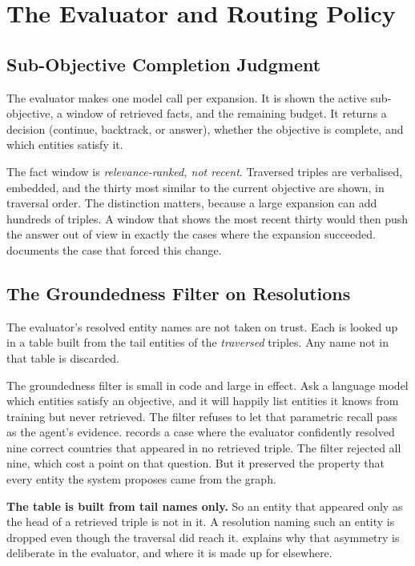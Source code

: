 \section{The Evaluator and Routing Policy}\label{sec:evaluator}

\subsection{Sub-Objective Completion Judgment}

The evaluator makes one model call per expansion. It is shown
the active sub-objective, a window of retrieved facts, and the remaining budget.
It returns a decision (\textsf{continue}, \textsf{backtrack}, or
\textsf{answer}), whether the objective is complete, and which entities satisfy
it.

The fact window is \emph{relevance-ranked, not recent}. Traversed triples are
verbalised, embedded, and the thirty most similar to the current objective are
shown, in traversal order. The distinction matters, because a large expansion
can add hundreds of triples. A window that shows the most recent thirty would
then push the answer out of view in exactly the cases where the expansion
succeeded.  documents the case that forced this
change.

\subsection{The Groundedness Filter on
Resolutions}\label{sec:groundedness-filter}

The evaluator's \textsf{resolved} entity names are not taken on trust.
Each is looked up in a table built from the tail entities of
the \emph{traversed} triples. Any name not in that table is discarded.

The groundedness filter is small in code and large in effect. Ask a language
model which entities satisfy an objective, and it will happily list entities it
knows from training but never retrieved. The filter refuses to let that
parametric recall pass as the agent's evidence. 
records a case where the evaluator confidently resolved nine correct countries
that appeared in no retrieved triple. The filter rejected all nine, which cost a
point on that question. But it preserved the property that every entity the
system proposes came from the graph.

\textbf{The table is built from tail names only.} So an entity that appeared
only as the head of a retrieved triple is not in it. A resolution naming such an
entity is dropped even though the traversal did reach it.
 explains why that asymmetry is deliberate in the
evaluator, and where it is made up for elsewhere.

